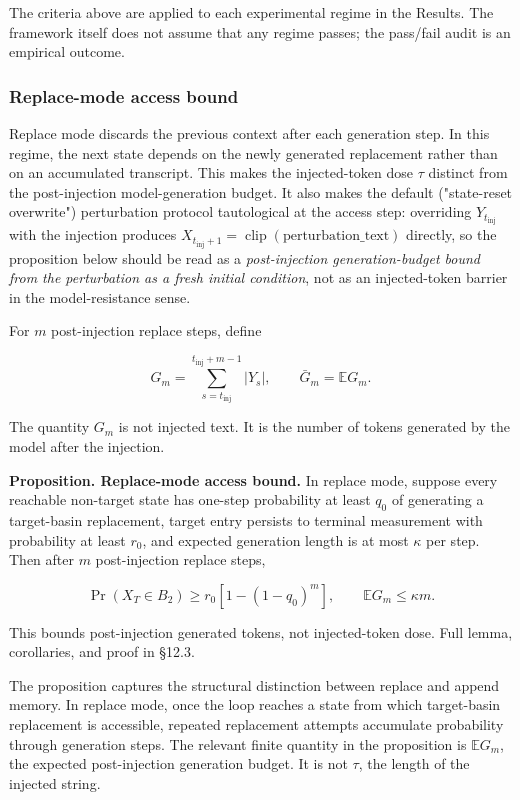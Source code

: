 \documentclass{article}
\theoremstyle{plain}
\theoremstyle{definition}
\begin{document}
The criteria above are applied to each experimental regime in the Results. The framework itself does not assume that any regime passes; the pass/fail audit is an empirical outcome.

\subsubsection{Replace-mode access bound}

Replace mode discards the previous context after each generation step. In this regime, the next state depends on the newly generated replacement rather than on an accumulated transcript. This makes the injected-token dose \(\tau\) distinct from the post-injection model-generation budget. It also makes the default ("state-reset overwrite") perturbation protocol tautological at the access step: overriding \(Y_{t_{\mathrm{inj}}}\) with the injection produces \(X_{t_{\mathrm{inj}}+1}=\operatorname{clip}(\text{perturbation\_text})\) directly, so the proposition below should be read as a \textit{post-injection generation-budget bound from the perturbation as a fresh initial condition}, not as an injected-token barrier in the model-resistance sense.

For \(m\) post-injection replace steps, define

\[G_m
=
\sum_{s=t_{\mathrm{inj}}}^{t_{\mathrm{inj}}+m-1} |Y_s|,
\qquad
\bar G_m=\mathbb{E}G_m.\]

The quantity \(G_m\) is not injected text. It is the number of tokens generated by the model after the injection.

\textbf{Proposition. Replace-mode access bound.} In replace mode, suppose every reachable non-target state has one-step probability at least \(q_0\) of generating a target-basin replacement, target entry persists to terminal measurement with probability at least \(r_0\), and expected generation length is at most \(\kappa\) per step. Then after \(m\) post-injection replace steps,

\[\Pr(X_T\in B_2)\ge r_0[1-(1-q_0)^m],
\qquad
\mathbb{E}G_m\le \kappa m .\]

This bounds post-injection generated tokens, not injected-token dose. Full lemma, corollaries, and proof in §12.3.

The proposition captures the structural distinction between replace and append memory. In replace mode, once the loop reaches a state from which target-basin replacement is accessible, repeated replacement attempts accumulate probability through generation steps. The relevant finite quantity in the proposition is \(\mathbb{E}G_m\), the expected post-injection generation budget. It is not \(\tau\), the length of the injected string.
\end{document}
